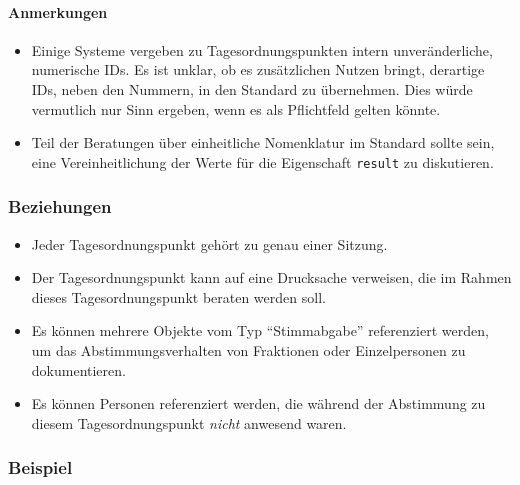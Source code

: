 \documentclass[,a4paper]{article}
\begin{document}
\paragraph{Anmerkungen}

\begin{itemize}
\item
  Einige Systeme vergeben zu Tagesordnungspunkten intern
  unveränderliche, numerische IDs. Es ist unklar, ob es zusätzlichen
  Nutzen bringt, derartige IDs, neben den Nummern, in den Standard zu
  übernehmen. Dies würde vermutlich nur Sinn ergeben, wenn es als
  Pflichtfeld gelten könnte.
\item
  Teil der Beratungen über einheitliche Nomenklatur im Standard sollte
  sein, eine Vereinheitlichung der Werte für die Eigenschaft
  \texttt{result} zu diskutieren.
\end{itemize}

\subsubsection{Beziehungen}

\begin{itemize}
\item
  Jeder Tagesordnungspunkt gehört zu genau einer Sitzung.
\item
  Der Tagesordnungspunkt kann auf eine Drucksache verweisen, die im
  Rahmen dieses Tagesordnungspunkt beraten werden soll.
\item
  Es können mehrere Objekte vom Typ ``Stimmabgabe'' referenziert werden,
  um das Abstimmungsverhalten von Fraktionen oder Einzelpersonen zu
  dokumentieren.
\item
  Es können Personen referenziert werden, die während der Abstimmung zu
  diesem Tagesordnungspunkt \emph{nicht} anwesend waren.
\end{itemize}

\subsubsection{Beispiel}
\end{document}
